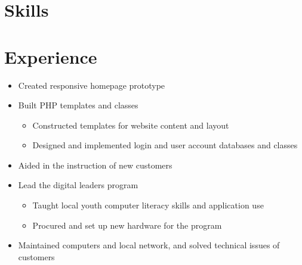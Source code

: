 \documentclass[11pt,sans]{moderncv}
\begin{document}
\makecvtitle

\vspace{-7mm}

\section{Skills}




\section{Experience}


\begin{itemize}
	\item Created responsive homepage prototype
	\item Built PHP templates and classes
	\begin{itemize}
		\item Constructed templates for website content and layout
		\item Designed and implemented login and user account databases and classes
	\end{itemize}
\end{itemize}

\vspace{2mm}


\begin{itemize}
\item Aided in the instruction of new customers
\item Lead the digital leaders program
\begin{itemize}
	\item Taught local youth computer literacy skills and application use
	\item Procured and set up new hardware for the program
\end{itemize}
\item Maintained computers and local network, and solved technical issues of customers
\end{itemize}
\end{document}
